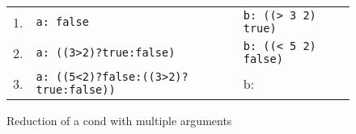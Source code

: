 \begin{figure}[ht]
\centering
\begin{tabular}{ r | l || l }
1. & \texttt{a: false} & \texttt{b: ((> 3 2) true)} \\
2. & \texttt{a: ((3>2)?true:false)} & \texttt{b: ((< 5 2) false)} \\
3. & \texttt{a: ((5<2)?false:((3>2)?true:false))} & b:
\end{tabular}
\caption{Reduction of a cond with multiple arguments}
\label{fig:emit-cond-expansion}
\end{figure}

